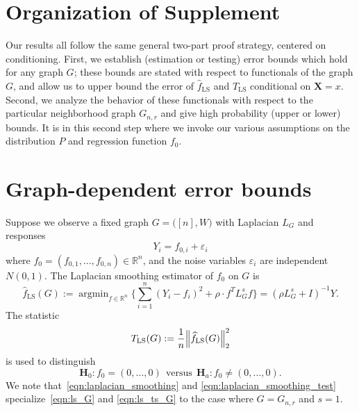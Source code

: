 \documentclass[twoside]{article}
\newcommand{\Reals}{\mathbb{R}}
\newcommand{\1}{\mathbf{1}}
\DeclareMathOperator*{\argmin}{argmin}
\newcommand{\Lap}{L}
\newcommand{\Id}{I}
\newcommand{\wh}[1]{\widehat{#1}}
\newcommand{\LS}{\mathrm{LS}}
\theoremstyle{definition}
\theoremstyle{remark}
\begin{document}
	
\onecolumn
{}

\section{Organization of Supplement}

Our results all follow the same general two-part proof strategy, centered on conditioning. First, we establish (estimation or testing) error bounds which hold for any graph $G$; these bounds are stated with respect to functionals of the graph $G$, and allow us to upper bound the error of $\wh{f}_{\LS}$ and $T_{\LS}$ conditional on $\mathbf{X} = x$. Second, we analyze the behavior of these functionals with respect to the particular neighborhood graph $G_{n,r}$ and give high probability (upper or lower) bounds. It is in this second step where we invoke our various assumptions on the distribution $P$ and regression function $f_0$.

\section{Graph-dependent error bounds}
\label{sec:fixed_graph_error_bounds}

Suppose we observe a fixed graph $G = \bigl([n],W\bigr)$ with Laplacian $\Lap_G$ and responses
\begin{equation}
\label{eqn:fixed_graph_regression_model}
Y_i = f_{0,i} + \varepsilon_i
\end{equation}
where $f_0 = (f_{0,1},\ldots,f_{0,n}) \in \Reals^n$, and the noise variables $\varepsilon_i$ are independent $N(0,1)$. The Laplacian smoothing estimator of $f_0$ on $G$ is
\begin{equation}
\label{eqn:ls_G}
\wh{f}_{\LS}(G) := \argmin_{f \in \Reals^n} \biggl\{ \sum_{i = 1}^{n}(Y_i - f_i)^2 + \rho \cdot f^T \Lap_G^{s}  f \biggr\} = (\rho \Lap_G^s + \Id)^{-1}Y.
\end{equation}
The statistic
\begin{equation}
\label{eqn:ls_ts_G}
T_{\LS}(G) := \frac{1}{n} \Bigl\|\wh{f}_{\LS}(G)\Bigr\|_2^2 
\end{equation}
is used to distinguish
\begin{equation*}
\mathbf{H}_0: f_{0} = (0,...,0) ~~\textrm{versus}~~ \mathbf{H}_a: f_{0} \neq (0,...,0).
\end{equation*}
We note that~\eqref{eqn:laplacian_smoothing} and \eqref{eqn:laplacian_smoothing_test} specialize~\eqref{eqn:ls_G} and \eqref{eqn:ls_ts_G} to the case where $G = G_{n,r}$ and $s = 1$.
\end{document}
